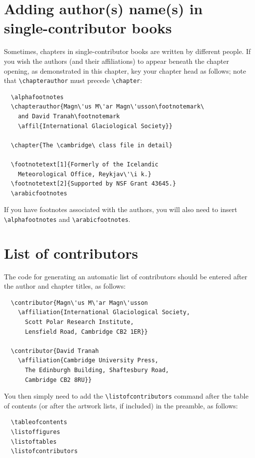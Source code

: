 \section{Adding author(s) name(s) in single-contributor books}
Sometimes, chapters in single-contributor books are written by different people. If you wish the authors (and their affiliations) to appear beneath the chapter opening, as demonstrated in this chapter, key your chapter head as follows; note that \verb"\chapterauthor" must precede \verb"\chapter":
\begin{verbatim}
  \alphafootnotes
  \chapterauthor{Magn\'us M\'ar Magn\'usson\footnotemark\
    and David Tranah\footnotemark
    \affil{International Glaciological Society}}

  \chapter{The \cambridge\ class file in detail}

  \footnotetext[1]{Formerly of the Icelandic
    Meteorological Office, Reykjav\'\i k.}
  \footnotetext[2]{Supported by NSF Grant 43645.}
  \arabicfootnotes
\end{verbatim}
If you have footnotes associated with the authors, you will also need to insert \verb"\alphafootnotes" and \verb"\arabicfootnotes".

\section{List of contributors}
\label{contrib}
The code for generating an automatic list of contributors should be entered after the author and chapter titles, as follows:
\begin{verbatim}
  \contributor{Magn\'us M\'ar Magn\'usson
    \affiliation{International Glaciological Society,
      Scott Polar Research Institute,
      Lensfield Road, Cambridge CB2 1ER}}

  \contributor{David Tranah
    \affiliation{Cambridge University Press,
      The Edinburgh Building, Shaftesbury Road,
      Cambridge CB2 8RU}}
\end{verbatim}
You then simply need to add the \verb"\listofcontributors" command after the table of contents (or after the artwork lists, if included) in the preamble, as follows:
\begin{verbatim}
  \tableofcontents
  \listoffigures
  \listoftables
  \listofcontributors
\end{verbatim}

